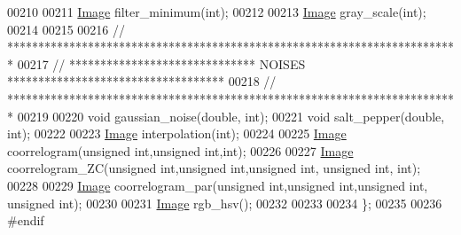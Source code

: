 \begin{DoxyCode}
00210     
00211     \hyperlink{class_image}{Image} filter\_minimum(\textcolor{keywordtype}{int});
00212 
00213     \hyperlink{class_image}{Image} gray\_scale(\textcolor{keywordtype}{int});
00214 
00215 
00216 \textcolor{comment}{// *************************************************************************}
00217 \textcolor{comment}{// ****************************** NOISES ***********************************}
00218 \textcolor{comment}{// *************************************************************************}
00219 
00220     \textcolor{keywordtype}{void} gaussian\_noise(\textcolor{keywordtype}{double}, \textcolor{keywordtype}{int});
00221     \textcolor{keywordtype}{void} salt\_pepper(\textcolor{keywordtype}{double}, \textcolor{keywordtype}{int}); 
00222     
00223     \hyperlink{class_image}{Image} interpolation(\textcolor{keywordtype}{int}); 
00224 
00225     \hyperlink{class_image}{Image} coorrelogram(\textcolor{keywordtype}{unsigned} \textcolor{keywordtype}{int},\textcolor{keywordtype}{unsigned} \textcolor{keywordtype}{int},\textcolor{keywordtype}{int}); 
00226     
00227     \hyperlink{class_image}{Image} coorrelogram\_ZC(\textcolor{keywordtype}{unsigned} \textcolor{keywordtype}{int},\textcolor{keywordtype}{unsigned} \textcolor{keywordtype}{int},\textcolor{keywordtype}{unsigned} \textcolor{keywordtype}{int}, \textcolor{keywordtype}{unsigned} \textcolor{keywordtype}{int}, \textcolor{keywordtype}{int}); 
00228 
00229     \hyperlink{class_image}{Image} coorrelogram\_par(\textcolor{keywordtype}{unsigned} \textcolor{keywordtype}{int},\textcolor{keywordtype}{unsigned} \textcolor{keywordtype}{int},\textcolor{keywordtype}{unsigned} \textcolor{keywordtype}{int}, \textcolor{keywordtype}{unsigned} \textcolor{keywordtype}{int}); 
00230 
00231     \hyperlink{class_image}{Image} rgb\_hsv();
00232     
00233 
00234 \};
00235 
00236 \textcolor{preprocessor}{#endif}
\end{DoxyCode}
